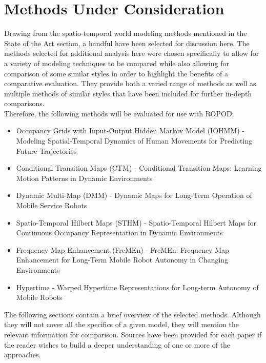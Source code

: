   \section{ Methods Under Consideration }

  Drawing from the spatio-temporal world modeling methods mentioned in the
  State of the Art section, a handful have been selected for discussion here.
  The methods selected for additional analysis here were chosen specifically
  to allow for a variety of modeling techniques to be compared while also
  allowing for comparison of some similar styles in order to highlight the
  benefits of a comparative evaluation. They provide both a varied range of
  methods as well as multiple methods of similar styles that have been included for
  further in-depth comparisons. \\

  Therefore, the following methods will be evaluated for use with ROPOD:

  \begin{itemize}
    \item Occupancy Grids with Input-Output Hidden Markov Model (IOHMM) - Modeling Spatial-Temporal Dynamics of Human Movements for Predicting Future Trajectories \cite{Wang2015}
    \item Conditional Transition Maps (CTM) - Conditional Transition Maps: Learning Motion Patterns in Dynamic Environments \cite{Kucner2013}
    \item Dynamic Multi-Map (DMM) - Dynamic Maps for Long-Term Operation of Mobile Service Robots \cite{Biber2005}
    \item Spatio-Temporal Hilbert Maps (STHM) - Spatio-Temporal Hilbert Maps for Continuous Occupancy Representation in Dynamic Environments \cite{Senanayake2016}
    \item Frequency Map Enhancement (FreMEn) - FreMEn: Frequency Map Enhancement for Long-Term Mobile Robot Autonomy in Changing Environments \cite{Krajnik2015}
    \item Hypertime - Warped Hypertime Representations for Long-term Autonomy of Mobile Robots \cite{Krajnik2018}
  \end{itemize}

  The following sections contain a brief overview of the selected methods.
  Although they will not cover all the specifics of a given model, they will
  mention the relevant information for comparison. Sources have been provided
  for each paper if the reader wishes to build a deeper understanding of one
  or more of the approaches. \\

